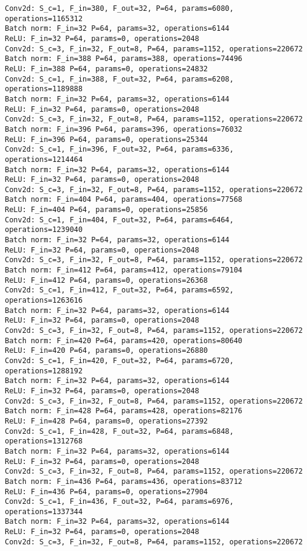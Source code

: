 \begin{Verbatim}[fontsize=\small]
Conv2d: S_c=1, F_in=380, F_out=32, P=64, params=6080, operations=1165312
Batch norm: F_in=32 P=64, params=32, operations=6144
ReLU: F_in=32 P=64, params=0, operations=2048
Conv2d: S_c=3, F_in=32, F_out=8, P=64, params=1152, operations=220672
Batch norm: F_in=388 P=64, params=388, operations=74496
ReLU: F_in=388 P=64, params=0, operations=24832
Conv2d: S_c=1, F_in=388, F_out=32, P=64, params=6208, operations=1189888
Batch norm: F_in=32 P=64, params=32, operations=6144
ReLU: F_in=32 P=64, params=0, operations=2048
Conv2d: S_c=3, F_in=32, F_out=8, P=64, params=1152, operations=220672
Batch norm: F_in=396 P=64, params=396, operations=76032
ReLU: F_in=396 P=64, params=0, operations=25344
Conv2d: S_c=1, F_in=396, F_out=32, P=64, params=6336, operations=1214464
Batch norm: F_in=32 P=64, params=32, operations=6144
ReLU: F_in=32 P=64, params=0, operations=2048
Conv2d: S_c=3, F_in=32, F_out=8, P=64, params=1152, operations=220672
Batch norm: F_in=404 P=64, params=404, operations=77568
ReLU: F_in=404 P=64, params=0, operations=25856
Conv2d: S_c=1, F_in=404, F_out=32, P=64, params=6464, operations=1239040
Batch norm: F_in=32 P=64, params=32, operations=6144
ReLU: F_in=32 P=64, params=0, operations=2048
Conv2d: S_c=3, F_in=32, F_out=8, P=64, params=1152, operations=220672
Batch norm: F_in=412 P=64, params=412, operations=79104
ReLU: F_in=412 P=64, params=0, operations=26368
Conv2d: S_c=1, F_in=412, F_out=32, P=64, params=6592, operations=1263616
Batch norm: F_in=32 P=64, params=32, operations=6144
ReLU: F_in=32 P=64, params=0, operations=2048
Conv2d: S_c=3, F_in=32, F_out=8, P=64, params=1152, operations=220672
Batch norm: F_in=420 P=64, params=420, operations=80640
ReLU: F_in=420 P=64, params=0, operations=26880
Conv2d: S_c=1, F_in=420, F_out=32, P=64, params=6720, operations=1288192
Batch norm: F_in=32 P=64, params=32, operations=6144
ReLU: F_in=32 P=64, params=0, operations=2048
Conv2d: S_c=3, F_in=32, F_out=8, P=64, params=1152, operations=220672
Batch norm: F_in=428 P=64, params=428, operations=82176
ReLU: F_in=428 P=64, params=0, operations=27392
Conv2d: S_c=1, F_in=428, F_out=32, P=64, params=6848, operations=1312768
Batch norm: F_in=32 P=64, params=32, operations=6144
ReLU: F_in=32 P=64, params=0, operations=2048
Conv2d: S_c=3, F_in=32, F_out=8, P=64, params=1152, operations=220672
Batch norm: F_in=436 P=64, params=436, operations=83712
ReLU: F_in=436 P=64, params=0, operations=27904
Conv2d: S_c=1, F_in=436, F_out=32, P=64, params=6976, operations=1337344
Batch norm: F_in=32 P=64, params=32, operations=6144
ReLU: F_in=32 P=64, params=0, operations=2048
Conv2d: S_c=3, F_in=32, F_out=8, P=64, params=1152, operations=220672

\end{Verbatim}

